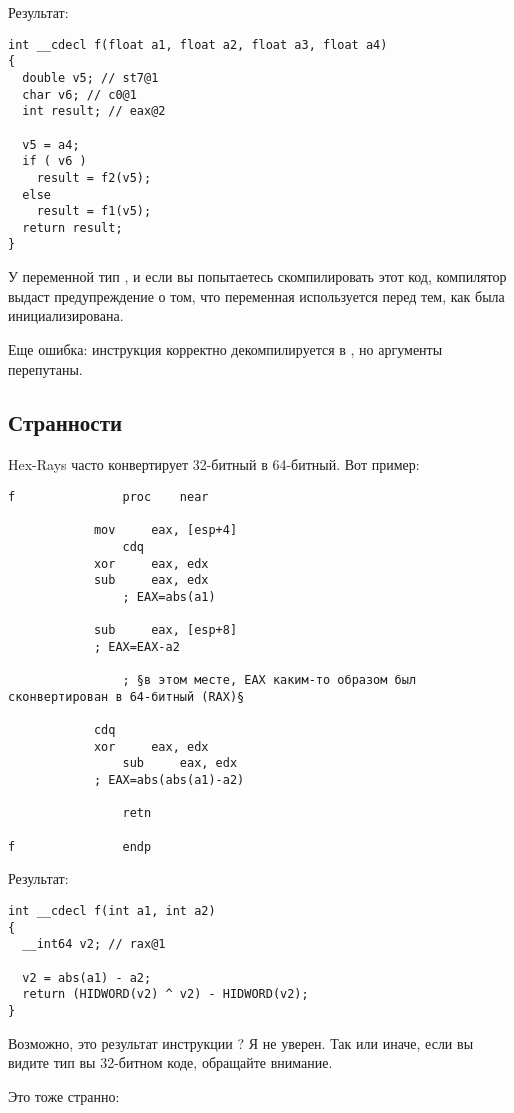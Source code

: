Результат:

\begin{lstlisting}
int __cdecl f(float a1, float a2, float a3, float a4)
{
  double v5; // st7@1
  char v6; // c0@1
  int result; // eax@2

  v5 = a4;
  if ( v6 )
    result = f2(v5);
  else
    result = f1(v5);
  return result;
}
\end{lstlisting}

У переменной  тип , и если вы попытаетесь скомпилировать этот код, компилятор выдаст предупреждение о том,
что переменная используется перед тем, как была инициализирована.

Еще ошибка: инструкция  корректно декомпилируется в , но аргументы перепутаны.

\subsection{Странности}

Hex-Rays часто конвертирует 32-битный  в 64-битный.
Вот пример:

\begin{lstlisting}
f               proc    near

	        mov     eax, [esp+4]
                cdq
	        xor     eax, edx
        	sub     eax, edx
                ; EAX=abs(a1)

	        sub     eax, [esp+8]
        	; EAX=EAX-a2

                ; §в этом месте, EAX каким-то образом был сконвертирован в 64-битный (RAX)§

	        cdq
        	xor     eax, edx
                sub     eax, edx
	        ; EAX=abs(abs(a1)-a2)

                retn

f               endp
\end{lstlisting}

Результат:

\begin{lstlisting}
int __cdecl f(int a1, int a2)
{
  __int64 v2; // rax@1

  v2 = abs(a1) - a2;
  return (HIDWORD(v2) ^ v2) - HIDWORD(v2);
}
\end{lstlisting}

Возможно, это результат инструкции ? Я не уверен.
Так или иначе, если вы видите тип  вы 32-битном коде, обращайте внимание.

Это тоже странно:

